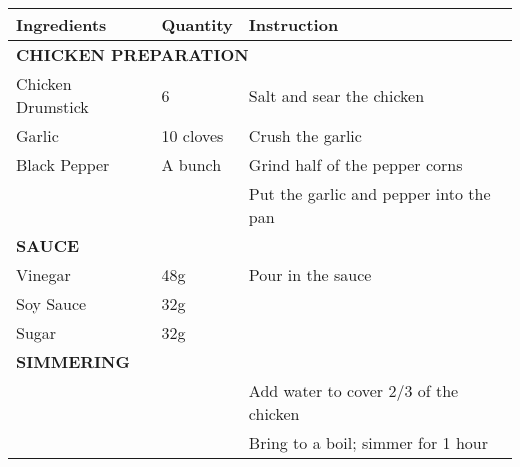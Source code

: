 \documentclass{article}
\newcommand{\tabletitle}[1]{\midrule\multicolumn{3}{l}{\textbf{\color{BrickRed} \MakeUppercase{#1}}}}
\begin{document}
\begin{tabular}{lll} \toprule
  \textbf{Ingredients} & \textbf{Quantity} & \textbf{Instruction}                   \\
  \tabletitle{Chicken Preparation}                                                  \\
  Chicken Drumstick    & 6                 & Salt and sear the chicken              \\
  Garlic               & 10 cloves         & Crush the garlic                       \\
  Black Pepper         & A bunch           & Grind half of the pepper corns         \\
                       &                   & Put the garlic and pepper into the pan \\
  \tabletitle{Sauce}                                                                \\
  Vinegar              & 48g               & Pour in the sauce                      \\
  Soy Sauce            & 32g               &                                        \\
  Sugar                & 32g               &                                        \\
  \tabletitle{Simmering}                                                            \\
                       &                   & Add water to cover 2/3 of the chicken  \\
                       &                   & Bring to a boil; simmer for 1 hour     \\
  \bottomrule
\end{tabular}
\end{document}
